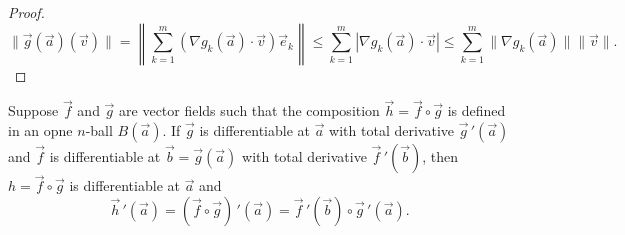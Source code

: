 \documentclass[a4paper]{ctexart}
\begin{document}
    \begin{proof}
        $$ \| \vec g(\vec a) (\vec v) \| = \left\| \sum_{k=1}^m \left( \nabla g_k(\vec a) \cdot \vec v\right) \vec e_k\right\| \le \sum_{k=1}^m \left| \nabla g_k(\vec a) \cdot \vec v\right| \le \sum_{k=1}^m \|\nabla g_k(\vec a)\| \|\vec v\|. $$
    \end{proof}
    \begin{mythm}
        Suppose $\vec f$ and $\vec g$ are vector fields such that the composition $\vec h = \vec f \circ \vec g$ is defined in an opne $n$-ball $B(\vec a)$. If $\vec g$ is differentiable at $\vec a$ with total derivative $\vec g\,'(\vec a)$ and $\vec f$ is differentiable at $\vec b = \vec g(\vec a)$ with total derivative $\vec f\,'(\vec b)$, then $h = \vec f \circ \vec g$ is differentiable at $\vec a$ and
        $$\vec h\,'(\vec a) =  (\vec f \circ \vec g)\,'(\vec a) = \vec f\,'(\vec b) \circ \vec g\,'(\vec a). $$
    \end{mythm}
\end{document}
